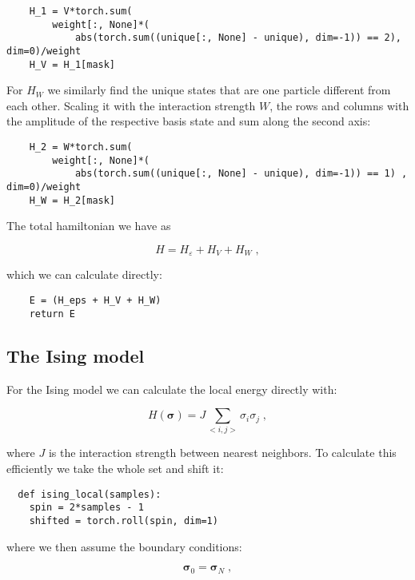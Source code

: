 \begin{verbatim}
    H_1 = V*torch.sum(
        weight[:, None]*(
            abs(torch.sum((unique[:, None] - unique), dim=-1)) == 2), dim=0)/weight
    H_V = H_1[mask]
\end{verbatim}

For $H_W$ we similarly find the unique states that are one particle different from each other. Scaling it with the interaction strength $W$, the rows and columns with the amplitude of the respective basis state and sum along the second axis:

\begin{verbatim} 
    H_2 = W*torch.sum(
        weight[:, None]*(
            abs(torch.sum((unique[:, None] - unique), dim=-1)) == 1) , dim=0)/weight
    H_W = H_2[mask]
\end{verbatim}

The total hamiltonian we have as

\[
  H = H_{\varepsilon} + H_V + H_W \; ,
\]

which we can calculate directly:

\begin{verbatim} 
    E = (H_eps + H_V + H_W)
    return E
\end{verbatim}


\subsection{The Ising model}

For the Ising model we can calculate the local energy directly with:

\begin{equation}
  H(\boldsymbol{\sigma}) = J\sum_{<i,j>}\sigma_i\sigma_j \; ,
  \label{eq:imp_hamil_ising}
\end{equation}

where $J$ is the interaction strength between nearest neighbors. To calculate this efficiently we take the whole set and shift it:

\begin{verbatim}
  def ising_local(samples):
    spin = 2*samples - 1
    shifted = torch.roll(spin, dim=1)
\end{verbatim}

where we then assume the boundary conditions:

\begin{equation}
  \mathbf{\sigma}_0 = \mathbf{\sigma}_N \; ,
  \label{eq:ising_boundary_imp}
\end{equation}

